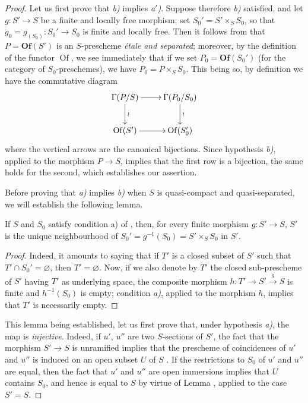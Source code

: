 \begin{proof}
Let us first prove that \emph{b)} implies \emph{a$'$)}.
Suppose therefore \emph{b)} satisfied, and let $g:S'\to S$ be a finite and locally free morphism;
set $S_0'=S'\times_S S_0$, so that $g_0=g_{(S_0)}:S_0'\to S_0$ is finite and locally free.
Then it follows from  that $P=\mathbf{Of}(S')$ is an $S$-prescheme \emph{\'etale and separated};
moreover, by the definition of the functor $\operatorname{Of}$, we see immediately that if we set $P_0=\mathbf{Of}(S_0')$ (for the category of $S_0$-preschemes), we have $P_0=P\times_S S_0$.
This being so, by definition we have the commutative diagram
\[
\xymatrix{
\Gamma(P/S)\ar[r]\ar[d]^{\wr} & \Gamma(P_0/S_0)\ar[d]^{\wr}\\
\operatorname{Of}(S')\ar[r] & \operatorname{Of}(S_0')
}
\]
where the vertical arrows are the canonical bijections.
Since hypothesis \emph{b)}, applied to the morphism $P\to S$, implies that the first row is a bijection, the same holds for the second, which establishes our assertion.

Before proving that \emph{a)} implies \emph{b)} when $S$ is quasi-compact and quasi-separated, we will establish the following lemma.

\begin{lemma}[18.5.4.3]
\label{IV.18.5.4.3}
If $S$ and $S_0$ satisfy condition \textup{a)} of , then, for every \textup{finite} morphism $g:S'\to S$, $S'$ is the unique neighbourhood of $S_0'=g^{-1}(S_0)=S'\times_S S_0$ in $S'$.
\end{lemma}

\begin{proof}
Indeed, it amounts to saying that if $T'$ is a closed subset of $S'$ such that $T'\cap S_0'=\varnothing$, then $T'=\varnothing$.
Now, if we also denote by $T'$ the closed sub-prescheme of $S'$ having $T'$ as underlying space, the composite morphism $h:T'\to S'\xrightarrow{g}S$ is finite and $h^{-1}(S_0)$ is empty;
condition \emph{a)}, applied to the morphism $h$, implies that $T'$ is necessarily empty.
\end{proof}

This lemma being established, let us first prove that, under hypothesis \emph{a)}, the map  is \emph{injective}.
Indeed, if $u'$, $u''$ are two $S$-sections of $S'$, the fact that the morphism $S'\to S$ is unramified implies that the prescheme of coincidences of $u'$ and $u''$ is induced on an open subset $U$ of $S$ .
If the restrictions to $S_0$ of $u'$ and $u''$ are equal, then the fact that $u'$ and $u''$ are open immersions  implies that $U$ contains $S_0$, and hence is equal to $S$ by virtue of Lemma , applied to the case $S'=S$.


\end{proof}
